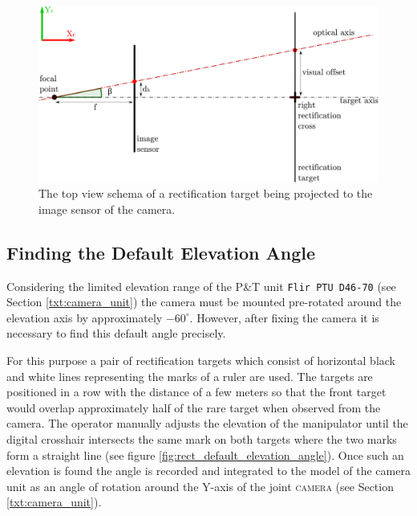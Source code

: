 \begin{figure}[htb]
\begin{minipage}{.59\textwidth}
		\label{fig:rect_azi_axis}
	\end{minipage}
\end{figure}




\begin{figure}[htb]
	\centering
	\includegraphics[width=0.65\linewidth]{fig/rect_pixel_offset.pdf}
	\caption{The top view schema of a rectification target being projected to the image sensor of the camera.}
	\label{fig:rect_pixel_offset}
\end{figure}


\subsection{Finding the Default Elevation Angle}

Considering the limited elevation range of the P\&T unit \texttt{Flir PTU D46-70} (see Section \ref{txt:camera_unit}) the camera must be mounted pre-rotated around the elevation axis by approximately $-60^{\circ}$. However, after fixing the camera it is necessary to find this default angle precisely. 

For this purpose a pair of rectification targets which consist of horizontal black and white lines representing the marks of a ruler are used. The targets are positioned in a row with the distance of a few meters so that the front target would overlap approximately half of the rare target when observed from the camera. The operator manually adjusts the elevation of the manipulator until the digital crosshair intersects the same mark on both targets where the two marks form a straight line (see figure \ref{fig:rect_default_elevation_angle}). Once such an elevation is found the angle is recorded and integrated to the model of the camera unit as an angle of rotation around the Y-axis of the joint \textsc{camera} (see Section \ref{txt:camera_unit}).

